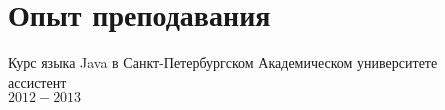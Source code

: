 \section{Опыт преподавания}
Курс языка Java в Санкт-Петербургском Академическом университете\\
ассистент\\ 
$2012-2013$



